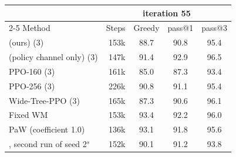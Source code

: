 \begin{tabular}{l r c c c }
\toprule
 & \multicolumn{4}{c}{iteration 55} \\
\cmidrule(lr){2-5}
Method & Steps & Greedy & pass@1 & pass@3 \\
\midrule
\wmppo{} (ours) (3) & 153k & 88.7 & 90.8 & 95.4 \\
\wmppo{} (policy channel only) (3) & 147k & 91.4\sigdn{} & 92.9\sigdn{} & 96.5 \\
PPO-160 (3) & 161k & 85.0\sigup{} & 87.3\sigup{} & 93.4 \\
PPO-256 (3) & 226k & 90.8\sigdn{} & 91.1 & 95.4 \\
Wide-Tree-PPO (3) & 165k & 87.3 & 90.6 & 96.1 \\
Fixed WM & 153k & 93.4\sigdn{} & 92.2 & 96.0 \\
PaW (coefficient 1.0) & 136k & 93.1\sigdn{} & 91.8 & 95.6 \\
\wmppo{}, second run of seed 2$^{s}$ & 152k & 90.1 & 91.2 & 93.8 \\
\bottomrule
\end{tabular}

